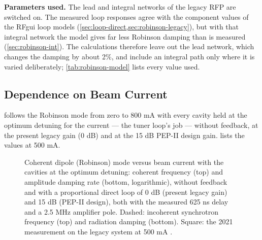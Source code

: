 \textbf{Parameters used.} The lead and integral networks of the legacy RFP are switched on. The measured loop responses agree with the component values of the RFgui loop models (\cref{sec:loop-direct,sec:robinson-legacy}), but with that integral network the model gives far less Robinson damping than is measured (\cref{sec:robinson-int}). The calculations therefore leave out the lead network, which changes the damping by about 2\%, and include an integral path only where it is varied deliberately; \cref{tab:robinson-model} lists every value used.

\subsection{Dependence on Beam Current}\label{sec:robinson-current}

 follows the Robinson mode from zero to 800 mA with every cavity held at the optimum detuning for the current --- the tuner loop's job --- without feedback, at the present legacy gain (0 dB) and at the 15 dB PEP-II design gain.  lists the values at 500 mA.

\begin{figure}[tbp]
\centering
\begin{fitpicture}\end{fitpicture}
\caption[Robinson mode versus beam current]{Coherent dipole (Robinson) mode versus beam current with the cavities at the optimum detuning: coherent frequency (top) and amplitude damping rate (bottom, logarithmic), without feedback and with a proportional direct loop of 0 dB (present legacy gain) and 15 dB (PEP-II design), both with the measured 625 ns delay and a 2.5 MHz amplifier pole. Dashed: incoherent synchrotron frequency (top) and radiation damping (bottom). Square: the 2021 measurement on the legacy system at 500 mA .}\label{fig:robinson-current}
\end{figure}

